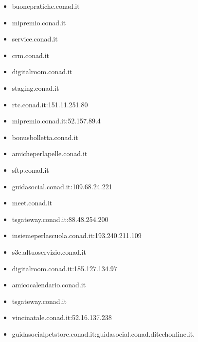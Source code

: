 \documentclass{article}
\begin{document}
\begin{itemize}
        \item buonepratiche.conad.it
    
        \item mipremio.conad.it
    
        \item service.conad.it
    
        \item crm.conad.it
    
        \item digitalroom.conad.it
    
        \item staging.conad.it
    
        \item rtc.conad.it:151.11.251.80
    
        \item mipremio.conad.it:52.157.89.4
    
        \item bonusbolletta.conad.it
    
        \item amicheperlapelle.conad.it
    
        \item sftp.conad.it
    
        \item guidasocial.conad.it:109.68.24.221
    
        \item meet.conad.it
    
        \item tsgateway.conad.it:88.48.254.200
    
        \item insiemeperlascuola.conad.it:193.240.211.109
    
        \item s3c.altuoservizio.conad.it
    
        \item digitalroom.conad.it:185.127.134.97
    
        \item amicocalendario.conad.it
    
        \item tsgateway.conad.it
    
        \item vincinatale.conad.it:52.16.137.238
    
        \item guidasocialpetstore.conad.it:guidasocial.conad.ditechonline.it.
    

\end{itemize}
\end{document}
